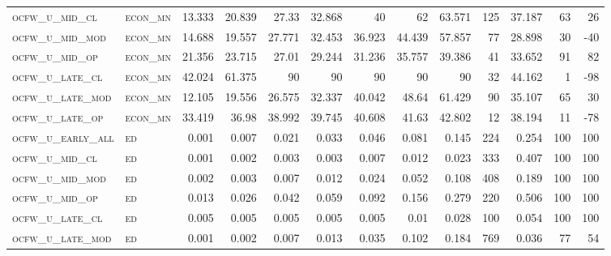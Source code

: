 \begin{landscape}
\begin{center}
\begin{footnotesize}
\begin{longtable}{llrrrrrrrr|rrr}
\textsc{ocfw\_u\_mid\_cl   } & \textsc{econ\_mn  }   & 13.333   & 20.839   & 27.33    & 32.868   & 40       & 62       & 63.571    & 125    & 37.187        & 63            & 26              \\
\textsc{ocfw\_u\_mid\_mod  } & \textsc{econ\_mn  }   & 14.688   & 19.557   & 27.771   & 32.453   & 36.923   & 44.439   & 57.857    & 77     & 28.898        & 30            & -40             \\
\textsc{ocfw\_u\_mid\_op   } & \textsc{econ\_mn  }   & 21.356   & 23.715   & 27.01    & 29.244   & 31.236   & 35.757   & 39.386    & 41     & 33.652        & 91            & 82              \\
\textsc{ocfw\_u\_late\_cl  } & \textsc{econ\_mn  }   & 42.024   & 61.375   & 90       & 90       & 90       & 90       & 90        & 32     & 44.162        & 1             & -98             \\
\textsc{ocfw\_u\_late\_mod } & \textsc{econ\_mn  }   & 12.105   & 19.556   & 26.575   & 32.337   & 40.042   & 48.64    & 61.429    & 90     & 35.107        & 65            & 30              \\
\textsc{ocfw\_u\_late\_op  } & \textsc{econ\_mn  }   & 33.419   & 36.98    & 38.992   & 39.745   & 40.608   & 41.63    & 42.802    & 12     & 38.194        & 11            & -78             \\
\textsc{ocfw\_u\_early\_all} & \textsc{ed        }   & 0.001    & 0.007    & 0.021    & 0.033    & 0.046    & 0.081    & 0.145     & 224    & 0.254         & 100           & 100             \\
\textsc{ocfw\_u\_mid\_cl   } & \textsc{ed        }   & 0.001    & 0.002    & 0.003    & 0.003    & 0.007    & 0.012    & 0.023     & 333    & 0.407         & 100           & 100             \\
\textsc{ocfw\_u\_mid\_mod  } & \textsc{ed        }   & 0.002    & 0.003    & 0.007    & 0.012    & 0.024    & 0.052    & 0.108     & 408    & 0.189         & 100           & 100             \\
\textsc{ocfw\_u\_mid\_op   } & \textsc{ed        }   & 0.013    & 0.026    & 0.042    & 0.059    & 0.092    & 0.156    & 0.279     & 220    & 0.506         & 100           & 100             \\
\textsc{ocfw\_u\_late\_cl  } & \textsc{ed        }   & 0.005    & 0.005    & 0.005    & 0.005    & 0.005    & 0.01     & 0.028     & 100    & 0.054         & 100           & 100             \\
\textsc{ocfw\_u\_late\_mod } & \textsc{ed        }   & 0.001    & 0.002    & 0.007    & 0.013    & 0.035    & 0.102    & 0.184     & 769    & 0.036         & 77            & 54              \\

\end{longtable}
\end{footnotesize}
\end{center}
\end{landscape}
